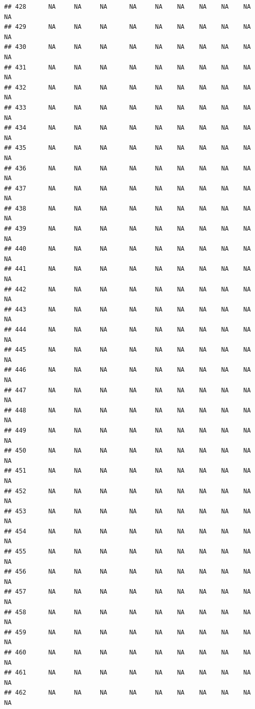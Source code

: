 \documentclass{article}\usepackage{graphicx, color}
\makeatletter
\newenvironment{kframe}{%
 \def\at@end@of@kframe{}%
 \ifinner\ifhmode%
  \def\at@end@of@kframe{\end{minipage}}%
  \begin{minipage}{\columnwidth}%
 \fi\fi%
 \def\FrameCommand##1{\hskip\@totalleftmargin \hskip-\fboxsep
 \colorbox{shadecolor}{##1}\hskip-\fboxsep
     \hskip-\linewidth \hskip-\@totalleftmargin \hskip\columnwidth}%
 \MakeFramed {\advance\hsize-\width
   \@totalleftmargin\z@ \linewidth\hsize
   \@setminipage}}%
 {\par\unskip\endMakeFramed%
 \at@end@of@kframe}
\newenvironment{knitrout}{}{} %
\makeatother
\begin{document}
\begin{knitrout}
\begin{kframe}
\begin{verbatim}
## 428      NA     NA     NA      NA     NA    NA    NA    NA    NA     NA
## 429      NA     NA     NA      NA     NA    NA    NA    NA    NA     NA
## 430      NA     NA     NA      NA     NA    NA    NA    NA    NA     NA
## 431      NA     NA     NA      NA     NA    NA    NA    NA    NA     NA
## 432      NA     NA     NA      NA     NA    NA    NA    NA    NA     NA
## 433      NA     NA     NA      NA     NA    NA    NA    NA    NA     NA
## 434      NA     NA     NA      NA     NA    NA    NA    NA    NA     NA
## 435      NA     NA     NA      NA     NA    NA    NA    NA    NA     NA
## 436      NA     NA     NA      NA     NA    NA    NA    NA    NA     NA
## 437      NA     NA     NA      NA     NA    NA    NA    NA    NA     NA
## 438      NA     NA     NA      NA     NA    NA    NA    NA    NA     NA
## 439      NA     NA     NA      NA     NA    NA    NA    NA    NA     NA
## 440      NA     NA     NA      NA     NA    NA    NA    NA    NA     NA
## 441      NA     NA     NA      NA     NA    NA    NA    NA    NA     NA
## 442      NA     NA     NA      NA     NA    NA    NA    NA    NA     NA
## 443      NA     NA     NA      NA     NA    NA    NA    NA    NA     NA
## 444      NA     NA     NA      NA     NA    NA    NA    NA    NA     NA
## 445      NA     NA     NA      NA     NA    NA    NA    NA    NA     NA
## 446      NA     NA     NA      NA     NA    NA    NA    NA    NA     NA
## 447      NA     NA     NA      NA     NA    NA    NA    NA    NA     NA
## 448      NA     NA     NA      NA     NA    NA    NA    NA    NA     NA
## 449      NA     NA     NA      NA     NA    NA    NA    NA    NA     NA
## 450      NA     NA     NA      NA     NA    NA    NA    NA    NA     NA
## 451      NA     NA     NA      NA     NA    NA    NA    NA    NA     NA
## 452      NA     NA     NA      NA     NA    NA    NA    NA    NA     NA
## 453      NA     NA     NA      NA     NA    NA    NA    NA    NA     NA
## 454      NA     NA     NA      NA     NA    NA    NA    NA    NA     NA
## 455      NA     NA     NA      NA     NA    NA    NA    NA    NA     NA
## 456      NA     NA     NA      NA     NA    NA    NA    NA    NA     NA
## 457      NA     NA     NA      NA     NA    NA    NA    NA    NA     NA
## 458      NA     NA     NA      NA     NA    NA    NA    NA    NA     NA
## 459      NA     NA     NA      NA     NA    NA    NA    NA    NA     NA
## 460      NA     NA     NA      NA     NA    NA    NA    NA    NA     NA
## 461      NA     NA     NA      NA     NA    NA    NA    NA    NA     NA
## 462      NA     NA     NA      NA     NA    NA    NA    NA    NA     NA

\end{verbatim}
\end{kframe}
\end{knitrout}
\end{document}
